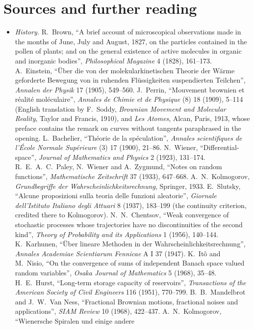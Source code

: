 \section*{Sources and further reading}

\begin{itemize}
\item \emph{History.} R.~Brown, ``A brief account of microscopical observations made in the months of June, July and August, 1827, on the particles contained in the pollen of plants; and on the general existence of
active molecules in organic and inorganic bodies'', \emph{Philosophical Magazine} 4 (1828), 161--173. A.~Einstein, ``\"Uber die von der molekularkinetischen Theorie der W\"arme geforderte Bewegung von in ruhenden
Fl\"ussigkeiten suspendierten Teilchen'', \emph{Annalen der Physik} 17 (1905), 549--560. J.~Perrin, ``Mouvement brownien et r\'ealit\'e mol\'eculaire'', \emph{Annales de Chimie et de Physique} (8) 18 (1909), 5--114
(English translation by F.~Soddy, \emph{Brownian Movement and Molecular Reality}, Taylor and Francis, 1910), and \emph{Les Atomes}, Alcan, Paris, 1913, whose preface contains the remark on curves without tangents
paraphrased in the opening. L.~Bachelier, ``Th\'eorie de la sp\'eculation'', \emph{Annales scientifiques de l'\'Ecole Normale Sup\'erieure} (3) 17 (1900), 21--86. N.~Wiener, ``Differential-space'', \emph{Journal of
Mathematics and Physics} 2 (1923), 131--174. R.~E.~A.~C.~Paley, N.~Wiener and A.~Zygmund, ``Notes on random functions'', \emph{Mathematische Zeitschrift} 37 (1933), 647--668. A.~N.~Kolmogorov, \emph{Grundbegriffe der
Wahrscheinlichkeitsrechnung}, Springer, 1933. E.~Slutsky, ``Alcune proposizioni sulla teoria delle funzioni aleatorie'', \emph{Giornale dell'Istituto Italiano degli Attuari} 8 (1937), 183--199 (the continuity criterion,
credited there to Kolmogorov). N.~N.~Chentsov, ``Weak convergence of stochastic processes whose trajectories have no discontinuities of the second kind'', \emph{Theory of Probability and its Applications} 1 (1956),
140--144. K.~Karhunen, ``\"Uber lineare Methoden in der Wahrscheinlichkeitsrechnung'', \emph{Annales Academiae Scientiarum Fennicae} A I 37 (1947). K.~It\^o and M.~Nisio, ``On the convergence of sums of independent Banach
space valued random variables'', \emph{Osaka Journal of Mathematics} 5 (1968), 35--48. H.~E.~Hurst, ``Long-term storage capacity of reservoirs'', \emph{Transactions of the American Society of Civil Engineers} 116 (1951),
770--799. B.~B.~Mandelbrot and J.~W.~Van Ness, ``Fractional Brownian motions, fractional noises and applications'', \emph{SIAM Review} 10 (1968), 422--437. A.~N.~Kolmogorov, ``Wienersche Spiralen und einige andere

\end{itemize}
